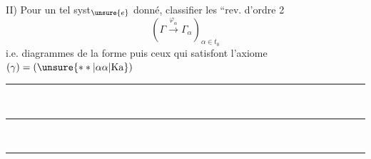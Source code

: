 II) Pour un tel syst$_{\unsure{e}}$ donné, classifier les ``rev. d'ordre 2 
\[
\left(\Gamma\xrightarrow{\varphi_\alpha}\Gamma_\alpha\right)_{\alpha\in t_0}
\]
i.e.   diagrammes  de la forme
puis ceux qui satisfont l'axiome $(\gamma)=(\unsure{**|\alpha\alpha|\mathrm{Ka}})$

\begin{center}\rule{.36\linewidth}{.35pt}\\[-.4em]\rule{.26\linewidth}{.35pt}\\[-.4em]\rule{.16\linewidth}{.35pt}\end{center}
